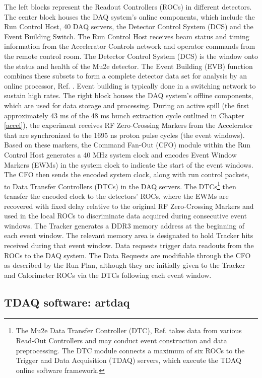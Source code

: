 The left blocks represent the Readout Controllers (ROCs) in different detectors. The center block houses the DAQ system's online components, which include the Run Control Host, 40 DAQ servers, the Detector Control System (DCS) and the Event Building Switch. The Run Control Host receives beam status and timing information from the Accelerator Controls network and operator commands from the remote control room. The Detector Control System (DCS) is the window onto the status and health of the Mu2e detector. The Event Building (EVB) function combines these subsets to form a complete detector data set for analysis by an online processor, Ref. \cite{bartoszek2015mu2e}. Event building is typically done in a switching network to sustain high rates. The right block houses the DAQ system's offline components, which are used for data storage and processing. During an active spill (the first approximately 43 ms of the 48 ms bunch extraction cycle outlined in Chapter \ref{accel}), the experiment receives RF Zero-Crossing Markers from the Accelerator that are synchronized to the 1695 ns proton pulse cycles (the event windows). Based on these markers, the Command Fan-Out (CFO) module within the Run Control Host generates a 40 MHz system clock and encodes Event Window Markers (EWMs) in the system clock to indicate the start of the event windows. The CFO then sends the encoded system clock, along with run control packets, to Data Transfer Controllers (DTCs) in the DAQ servers. The DTCs\footnote{The Mu2e Data Transfer Controller (DTC), Ref. \cite{ryan} takes data from various Read-Out Controllers and may conduct event construction and data preprocessing. The DTC module connects a maximum of six ROCs to the Trigger and Data Acquisition (TDAQ) servers, which execute the TDAQ online software framework.} then transfer the encoded clock to the detectors' ROCs, where the EWMs are recovered with fixed delay relative to the original RF Zero-Crossing Markers and used in the local ROCs to discriminate data acquired during consecutive event windows. The Tracker generates a DDR3 memory address at the beginning of each event window. The relevant memory area is designated to hold Tracker hits received during that event window. Data requests trigger data readouts from the ROCs to the DAQ system. The Data Requests are modifiable through the CFO as described by the Run Plan, although they are initially given to the Tracker and Calorimeter ROCs via the DTCs following each event window.

\subsection{TDAQ software: artdaq}





